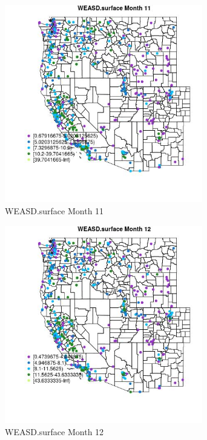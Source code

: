 \begin{figure} 
\centering  
\includegraphics[width=0.77\textwidth]{Code_Outputs/ML_input_report_ML_input_PM25_Step5_part_d_de_duplicated_aves_ML_input_MapObsMo11WEASDsurface.jpg} 
\caption{\label{fig:ML_input_report_ML_input_PM25_Step5_part_d_de_duplicated_aves_ML_inputMapObsMo11WEASDsurface}WEASD.surface Month 11} 
\end{figure} 
 

\begin{figure} 
\centering  
\includegraphics[width=0.77\textwidth]{Code_Outputs/ML_input_report_ML_input_PM25_Step5_part_d_de_duplicated_aves_ML_input_MapObsMo12WEASDsurface.jpg} 
\caption{\label{fig:ML_input_report_ML_input_PM25_Step5_part_d_de_duplicated_aves_ML_inputMapObsMo12WEASDsurface}WEASD.surface Month 12} 
\end{figure} 
 

